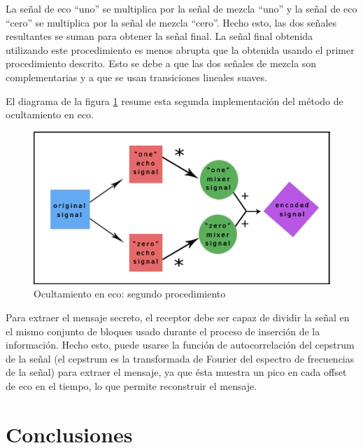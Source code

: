 \documentclass[12pt]{article}
\begin{document}
La señal de eco ``uno'' se multiplica por la señal de mezcla ``uno'' y la señal de eco ``cero'' se multiplica por la señal de mezcla ``cero''. Hecho esto, las dos señales resultantes se suman para obtener la señal final. La señal final obtenida utilizando este procedimiento es menos abrupta que la obtenida usando el primer procedimiento descrito. Esto se debe a que las dos señales de mezcla son complementarias y a que se usan transiciones lineales suaves.

El diagrama de la figura \ref{echo2ndimp} resume esta segunda implementación del método de ocultamiento en eco.

\begin{figure}
  \centering
    \includegraphics[width=\textwidth]{img/echo2ndimp}
  \caption{Ocultamiento en eco: segundo procedimiento}
  \label{echo2ndimp}
\end{figure}

Para extraer el mensaje secreto, el receptor debe ser capaz de dividir la señal en el mismo conjunto de bloques usado durante el proceso de inserción de la información. Hecho esto, puede usarse la función de autocorrelación del cepstrum de la señal (el cepstrum es la transformada de Fourier del espectro de frecuencias de la señal) para extraer el mensaje, ya que ésta muestra un pico en cada offset de eco en el tiempo, lo que permite reconstruir el mensaje.

\section{Conclusiones}
\end{document}
